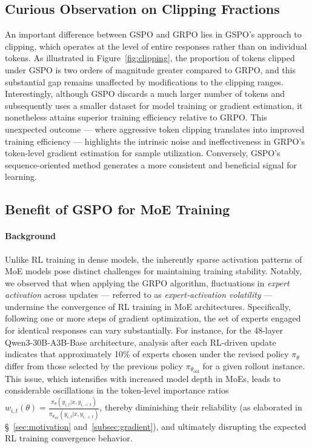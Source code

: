\subsection{Curious Observation on Clipping Fractions}

An important difference between GSPO and GRPO lies in GSPO's approach to clipping, which operates at the level of entire responses rather than on individual tokens. As illustrated in Figure~\ref{fig:clipping}, the proportion of tokens clipped under GSPO is two orders of magnitude greater compared to GRPO, and this substantial gap remains unaffected by modifications to the clipping ranges. Interestingly, although GSPO discards a much larger number of tokens and subsequently uses a smaller dataset for model training or gradient estimation, it nonetheless attains superior training efficiency relative to GRPO. This unexpected outcome — where aggressive token clipping translates into improved training efficiency — highlights the intrinsic noise and ineffectiveness in GRPO’s token-level gradient estimation for sample utilization. Conversely, GSPO's sequence-oriented method generates a more consistent and beneficial signal for learning.

\subsection{Benefit of GSPO for MoE Training}
\label{subsec:routing_replay}

\paragraph{Background}
Unlike RL training in dense models, the inherently sparse activation patterns of MoE models pose distinct challenges for maintaining training stability. Notably, we observed that when applying the GRPO algorithm, fluctuations in \textit{expert activation} across updates — referred to as \textit{expert-activation volatility} — undermine the convergence of RL training in MoE architectures. Specifically, following one or more steps of gradient optimization, the set of experts engaged for identical responses can vary substantially. For instance, for the 48-layer Qwen3-30B-A3B-Base architecture, analysis after each RL-driven update indicates that approximately 10\% of experts chosen under the revised policy $\pi_{\theta}$ differ from those selected by the previous policy $\pi_{\theta_\text{old}}$ for a given rollout instance. This issue, which intensifies with increased model depth in MoEs, leads to considerable oscillations in the token-level importance ratios $w_{i,t}(\theta) = \frac{ \pi_{\theta} (y_{i,t} | x, y_{i,<t}) }{ \pi_{\theta_\text{old}} (y_{i,t} | x,y_{i,<t})}$, thereby diminishing their reliability (as elaborated in \S~\ref{sec:motivation} and~\ref{subsec:gradient}), and ultimately disrupting the expected RL training convergence behavior.

